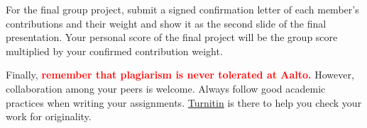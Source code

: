 For the final group project, submit a signed confirmation letter of each member's contributions and their weight and show it as the second slide of the final presentation. Your personal score of the final project will be the group score multiplied by your confirmed contribution weight.

Finally, \textcolor{red}{\textbf{remember that plagiarism is never tolerated at Aalto.}} However, collaboration among your peers is welcome. Always follow good academic practices when writing your assignments. \href{https://www.aalto.fi/en/services/turnitin-an-originality-checking-and-feedback-software}{Turnitin} is there to help you check your work for originality.